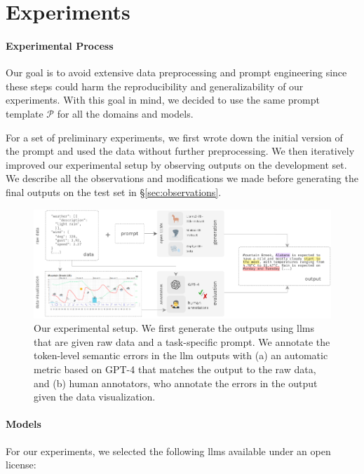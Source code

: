 \section{Experiments}
\label{sec:experiments}
\paragraph{Experimental Process}
\label{sec:process}
Our goal is to avoid extensive data preprocessing and prompt engineering since these steps could harm the reproducibility and generalizability of our experiments. With this goal in mind, we decided to use the same prompt template $\mathcal{P}$ for all the domains and models.

For a set of preliminary experiments, we first wrote down the initial version of the prompt and used the data without further preprocessing.
We then iteratively improved our experimental setup by observing outputs on the development set.
We describe all the observations and modifications we made before generating the final outputs on the test set in §\ref{sec:observations}.

\begin{figure}[ht]
    \centering
    \includegraphics[width=\textwidth]{img/quintd_process.pdf}
    \caption{Our experimental setup. We first generate the outputs using \acp{llm} that are given raw data and a task-specific prompt. We annotate the token-level semantic errors in the \ac{llm} outputs with (a) an automatic metric based on GPT-4 that matches the output to the raw data, and (b) human annotators, who annotate the errors in the output given the data visualization.}\label{fig:process}
\end{figure}

\paragraph{Models}
\label{sec:models}
For our experiments, we selected the following \acp{llm} available under an open license:

